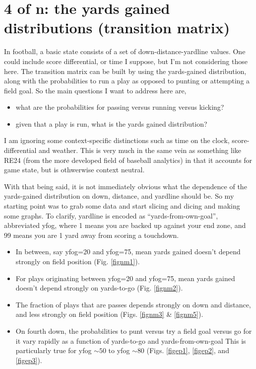 \documentclass{article}
\begin{document}
\section{4 of n: the yards gained distributions (transition matrix)}

In football, a basic state consists of a set of down-distance-yardline values. One could include score differential, or time I suppose, but I'm not considering those here. The transition matrix can be built by using the yards-gained distribution, along with the probabilities to run a play as opposed to punting or attempting a field goal. So the main questions I want to address here are, 

\begin{itemize}

\item what are the probabilities for passing versus running versus kicking?

\item given that a play is run, what is the yards gained distribution? 

\end{itemize}

I am ignoring some context-specific distinctions such as time on the clock, score-differential and weather. This is very much in the same vein as something like RE24 (from the more developed field of baseball analytics) in that it accounts for game state, but is othwerwise context neutral. 

With that being said, it is not immediately obvious what the dependence of the yards-gained distribution on down, distance, and yardline should be. So my starting point was to grab some data and start slicing and dicing and making some graphs. To clarify, yardline is encoded as ``yards-from-own-goal'', abbreviated yfog, where 1 means you are backed up against your end zone, and 99 means you are 1 yard away from scoring a touchdown.

\begin{itemize}

\item In between, say yfog=20 and yfog=75, mean yards gained doesn't depend strongly on field position (Fig. \ref{fignm1}).



\item For plays originating between yfog=20 and yfog=75, mean yards gained doesn't depend strongly on yards-to-go (Fig. \ref{fignm2}).



\item The fraction of plays that are passes depends strongly on down and distance, and less strongly on field position (Figs. \ref{fignm3} \& \ref{fignm5}).



\item On fourth down, the probabilities to punt versus try a field goal versus go for it vary rapidly as a function of yards-to-go and yards-from-own-goal This is particularly true for yfog $\sim 50$ to yfog $\sim 80$ (Figs. \ref{figep1}, \ref{figep2}, and \ref{figep3}).


\end{itemize}
\end{document}
